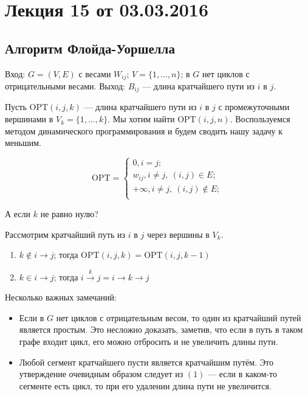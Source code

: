



\section*{Лекция 15 от 03.03.2016}

\subsection{Алгоритм Флойда-Уоршелла}

Вход: $G = (V, E)$ с весами $W_{ij}$; $V = \{1,\ldots, n\}$; в $G$ нет циклов с отрицательными весами.
Выход: $B_{ij}$ --- длина кратчайшего пути из $i$ в $j$.

Пусть OPT$(i, j, k)$ --- длина кратчайшего пути из $i$ в $j$ с промежуточными вершинами в $V_k = \{1,\ldots,k\}$.
Мы хотим найти OPT$(i, j, n)$. Воспользуемся методом динамического программирования и будем сводить нашу задачу к меньшим.

\[
    \mathrm{OPT} =
    \begin{cases}
        0, i=j;\\
        w_{ij}, i\neq j,\ (i,j) \in E;\\
        +\infty, i\neq j,\ (i,j) \not\in E;\\
    \end{cases}
\]

А если $k$ не равно нулю?

Рассмотрим кратчайший путь из $i$ в $j$ через вершины в $V_k$.
\begin{enumerate}
    \item $k \not \in i \longrightarrow j$; тогда OPT$(i, j, k) = \mathrm{OPT}(i, j, k-1)$
    \item $k \in i \longrightarrow j$; тогда $i \xrightarrow{\ \ k\ \ } j =  i \longrightarrow k \longrightarrow j$
\end{enumerate}

Несколько важных замечаний:
\begin{itemize}
    \item Если в $G$ нет циклов с отрицательным весом, то один из кратчайший путей является простым. Это несложно доказать, заметив, что если в путь в таком графе входит цикл, его можно отбросить и не увеличить длины пути.
    \item Любой сегмент кратчайшего пусти является кратчайшим путём. Это утверждение очевидным образом следует из $(1)$ --- если в каком-то сегменте есть цикл, то при его удалении длина пути не увеличится. 
\end{itemize}


